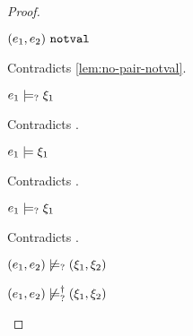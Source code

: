\begin{proof}
\begin{byCases}
\begin{byCases}
\begin{byCases}
\begin{byCases}
\begin{pfsteps*}
                \item $(e_1 , e_2) ~\mathtt{notval}$ 
                \end{pfsteps*}
                Contradicts \autoref{lem:no-pair-notval}.
            \item[\text{(\ref{rule:CMSPair1})}]
                \begin{pfsteps*}
                \item $e_1 \models_{?} \xi_1$ 
                \end{pfsteps*}
                Contradicts .
            \item[\text{(\ref{rule:CMSPair2})}]
                \begin{pfsteps*}
                \item $e_1 \models \xi_1$ 
                \end{pfsteps*}
                Contradicts .
            \item[\text{(\ref{rule:CMSPair3})}]
                \begin{pfsteps*}
                \item $e_1 \models_{?} \xi_1$ 
                \end{pfsteps*}
                Contradicts .
            \end{byCases}
            \begin{pfsteps*}
            \item $(e_1 , e_2) \not\models_{?} (\xi_1 , \xi_2)$  
            \item $(e_1 , e_2) \not\models_{?}^{\dag} (\xi_1 , \xi_2)$ 
            \end{pfsteps*}
            

\end{byCases}
\end{byCases}
\end{byCases}
\end{proof}
